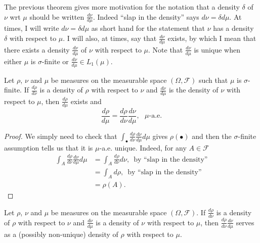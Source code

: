  The previous theorem gives more motivation for the notation that a density $\delta$ of $\nu$ wrt $\mu$ should be written $\frac{d\nu}{d\mu}$. Indeed ``slap in the density'' says $d\nu = \delta d\mu$. At times, I will write $d\nu = \delta d\mu$ as short hand for the statement that $\nu$ has a density $\delta$ with respect to $\mu$.
I will also, at times, say that $\frac{d\nu}{d\mu}$ exists, by which I mean that there exists a density $\frac{d\nu}{d\mu}$ of $\nu$ with respect to $\mu$.
 Note that $\frac{d\nu}{d\mu}$ is unique when either $\mu$ is $\sigma$-finite or $\frac{d\nu}{d\mu}\in L_1(\mu)$.

\begin{theorem}
\label{thm: chain rule for sigma finite}
Let $\rho$, $\nu$ and $\mu$ be measures on the measurable space $(\Omega,\mathcal F)$ such that $\mu$ is $\sigma$-finite.   If $\frac{d\rho}{d\nu}$ is a density of $\rho$ with respect to  $\nu$
and $\frac{d\nu}{d\mu}$ is the density of $\nu$ with respect to $\mu$, then $\frac{d\rho}{d\mu}$ exists and
\[ \frac{d\rho}{d\mu}=\frac{d\rho}{d\nu} \frac{d\nu}{d\mu},\text{ $\mu $-a.e.}\]
\end{theorem}
\begin{proof}
We simply need to check that $\int_\bullet\frac{d\rho}{d\nu} \frac{d\nu}{d\mu} d\mu$ gives $\rho(\bullet)$ and then the $\sigma$-finite assumption tells us that it is $\mu $-a.e.\! unique. Indeed, for any $A\in \mathcal F$
\begin{align*}
\int_A \frac{d\rho}{d\nu} \frac{d\nu}{d\mu} d\mu
&= \int_A \frac{d\rho}{d\nu} d\nu,\,\text{ by ``slap in the density''} \\
&= \int_A d\rho,\,\text{ by ``slap in the density''} \\
&= \rho(A).
\end{align*}
\end{proof}



\begin{theorem} Let $\rho$, $\nu$ and $\mu$ be measures on the measurable space $(\Omega,\mathcal F)$.   If $\frac{d\rho}{d\nu}$ is a density of $\rho$ with respect to $\nu$
and $\frac{d\nu}{d\mu}$ is a density of $\nu$ with respect to $\mu$, then $ \frac{d\rho}{d\nu} \frac{d\nu}{d\mu}$ serves as a (possibly non-unique)  density of $\rho$  with respect to $\mu$.
\end{theorem}

